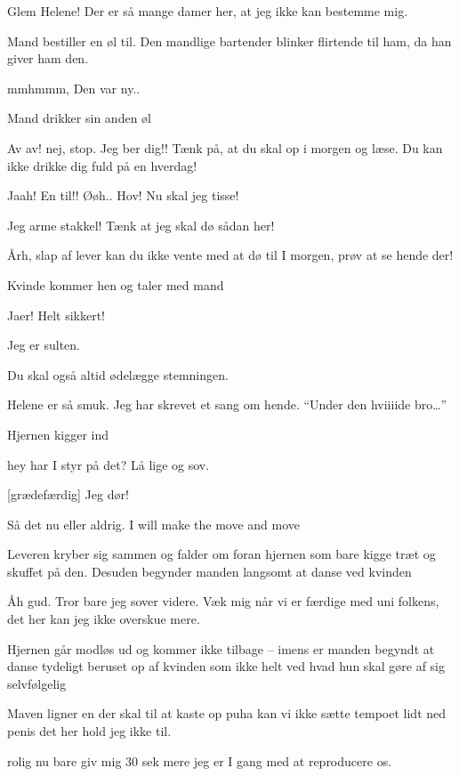 \documentclass[a4paper,11pt]{article}
\begin{document}
\begin{sketch}
 Glem Helene! Der er så mange damer her, at jeg ikke kan bestemme mig.

\scene Mand bestiller en øl til. Den mandlige bartender blinker flirtende til ham, da han giver ham den.

 mmhmmm, Den var ny..

\scene Mand drikker sin anden øl

 Av av! nej, stop. Jeg ber dig!! Tænk på, at du skal op i morgen og læse. Du kan ikke drikke dig fuld på en hverdag!

 Jaah! En til!! Øøh.. Hov! Nu skal jeg tisse!

 Jeg arme stakkel! Tænk at jeg skal dø sådan her!

 Årh, slap af lever kan du ikke vente med at dø til I morgen, prøv at se hende der!

\scene Kvinde kommer hen og taler med mand

 Jaer! Helt sikkert!

 Jeg er sulten.

 Du skal også altid ødelægge stemningen.

 Helene er så smuk. Jeg har skrevet et sang om hende. ``Under den hviiiide bro\ldots''

\scene Hjernen kigger ind

 hey har I styr på det? Lå lige og sov.

[grædefærdig] Jeg dør!

 Så det nu eller aldrig. I will make the move and move

\scene Leveren kryber sig sammen og falder om foran hjernen som bare kigge træt og skuffet på den. Desuden begynder manden langsomt at danse ved kvinden

 Åh gud. Tror bare jeg sover videre. Væk mig når vi er færdige med uni folkens, det her kan jeg ikke overskue mere.

\scene Hjernen går modløs ud og kommer ikke tilbage -- imens er manden begyndt at danse tydeligt beruset op af kvinden som ikke helt ved hvad hun skal gøre af sig selvfølgelig

\scene Maven ligner en der skal til at kaste op
 puha kan vi ikke sætte tempoet lidt ned penis det her hold jeg ikke til.

 rolig nu bare giv mig 30 sek mere jeg er I gang med at reproducere os.


\end{sketch}
\end{document}
